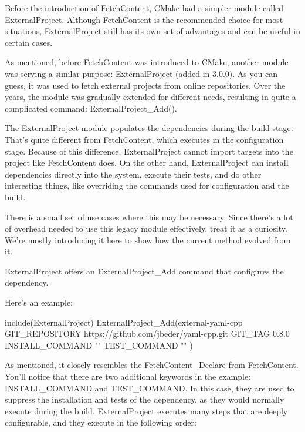 Before the introduction of FetchContent, CMake had a simpler module called ExternalProject. Although FetchContent is the recommended choice for most situations, ExternalProject still has its own set of advantages and can be useful in certain cases.


As mentioned, before FetchContent was introduced to CMake, another module was serving a similar purpose: ExternalProject (added in 3.0.0). As you can guess, it was used to fetch external projects from online repositories. Over the years, the module was gradually extended for different needs, resulting in quite a complicated command: ExternalProject\_Add().

The ExternalProject module populates the dependencies during the build stage. That’s quite different from FetchContent, which executes in the configuration stage. Because of this difference, ExternalProject cannot import targets into the project like FetchContent does. On the other hand, ExternalProject can install dependencies directly into the system, execute their tests, and do other interesting things, like overriding the commands used for configuration and the build.

There is a small set of use cases where this may be necessary. Since there’s a lot of overhead needed to use this legacy module effectively, treat it as a curiosity. We’re mostly introducing it here to show how the current method evolved from it.

ExternalProject offers an ExternalProject\_Add command that configures the dependency.

Here’s an example:

\begin{cmake}
include(ExternalProject)
ExternalProject_Add(external-yaml-cpp
    GIT_REPOSITORY   https://github.com/jbeder/yaml-cpp.git
    GIT_TAG          0.8.0
    INSTALL_COMMAND  ""
    TEST_COMMAND     ""
)
\end{cmake}

As mentioned, it closely resembles the FetchContent\_Declare from FetchContent. You’ll notice that there are two additional keywords in the example: INSTALL\_COMMAND and TEST\_COMMAND. In this case, they are used to suppress the installation and tests of the dependency, as they would normally execute during the build. ExternalProject executes many steps that are deeply configurable, and they execute in the following order:

